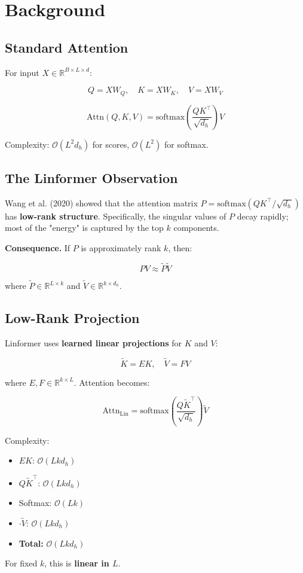 \section{Background}

\subsection{Standard Attention}

For input $X \in \mathbb{R}^{B \times L \times d}$:

\[
Q = X W_Q, \quad K = X W_K, \quad V = X W_V
\tag{3.1}
\]

\[
\text{Attn}(Q, K, V) = \text{softmax}\!\left(\frac{Q K^\top}{\sqrt{d_h}}\right) V
\tag{3.2}
\]

Complexity: $\mathcal{O}(L^2 d_h)$ for scores, $\mathcal{O}(L^2)$ for softmax.

\subsection{The Linformer Observation}

Wang et al. (2020) showed that the attention matrix $P = \text{softmax}(QK^\top/\sqrt{d_h})$ 
has \textbf{low-rank structure}. Specifically, the singular values of $P$ decay 
rapidly; most of the "energy" is captured by the top $k$ components.

\textbf{Consequence.} If $P$ is approximately rank $k$, then:

\[
P V \approx \tilde{P} \tilde{V}
\tag{3.3}
\]

where $\tilde{P} \in \mathbb{R}^{L \times k}$ and $\tilde{V} \in \mathbb{R}^{k \times d_h}$.

\subsection{Low-Rank Projection}

Linformer uses \textbf{learned linear projections} for $K$ and $V$:

\[
\tilde{K} = E K, \quad \tilde{V} = F V
\tag{3.4}
\]

where $E, F \in \mathbb{R}^{k \times L}$. Attention becomes:

\[
\text{Attn}_\text{Lin} = \text{softmax}\!\left(\frac{Q \tilde{K}^\top}{\sqrt{d_h}}\right) \tilde{V}
\tag{3.5}
\]

Complexity: 
\begin{itemize}
\item $E K$: $\mathcal{O}(L k d_h)$
\item $Q \tilde{K}^\top$: $\mathcal{O}(L k d_h)$
\item Softmax: $\mathcal{O}(L k)$
\item $\cdot \tilde{V}$: $\mathcal{O}(L k d_h)$
\item \textbf{Total:} $\mathcal{O}(L k d_h)$

\end{itemize}
For fixed $k$, this is \textbf{linear in $L$}.

